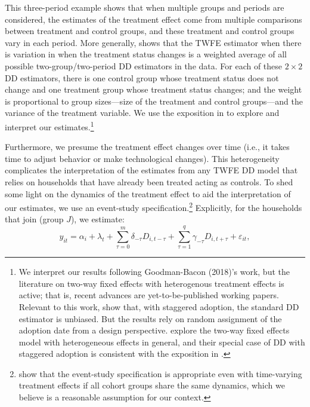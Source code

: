 \documentclass[12pt]{article}
\begin{document}
This three-period example shows that when multiple groups and periods are considered, the estimates of the treatment effect come from multiple comparisons between treatment and control groups, and these treatment and control groups vary in each period. More generally, \citet{goodman-baconDifferenceinDifferencesVariationTreatment2018} shows that the TWFE estimator when there is variation in when the treatment status changes is a weighted average of all possible two-group/two-period DD estimators in the data. For each of these $2 \times 2$ DD estimators, there is one control group whose treatment status does not change and one treatment group whose treatment status changes; and the weight is proportional to group sizes---size of the treatment and control groups---and the variance of the treatment variable. We use the exposition in \citet{goodman-baconDifferenceinDifferencesVariationTreatment2018} to explore and interpret our estimates.\footnote{We interpret our results following Goodman-Bacon (2018)'s work, but the literature on two-way fixed effects with heterogenous treatment effects is active; that is, recent advances are yet-to-be-published working papers. Relevant to this work, \citet{atheyDesignbasedAnalysisDifferenceInDifferences2018} show that, with staggered adoption, the standard DD estimator is unbiased. But the results rely on random assignment of the adoption date from a design perspective. \citet{dechaisemartinTwowayFixedEffects2020} explore the two-way fixed effects model with heterogeneous effects in general, and their special case of DD with staggered adoption is consistent with the exposition in \citet{goodman-baconDifferenceinDifferencesVariationTreatment2018}.}

Furthermore, we presume the treatment effect changes over time (i.e., it takes time to adjust behavior or make technological changes). This heterogeneity complicates the interpretation of the estimates from any TWFE DD model that relies on households that have already been treated acting as controls. To shed some light on the dynamics of the treatment effect to aid the interpretation of our estimates, we use an event-study specification.\footnote{\citet{sunEstimatingDynamicTreatment2020} show that the event-study specification is appropriate even with time-varying treatment effects if all cohort groups share the same dynamics, which we believe is a reasonable assumption for our context. } Explicitly, for the households that join (group $J$), we estimate:
\begin{equation}
	y_{it} = \alpha_{i} + \lambda_{t} + \sum_{\tau = 0}^{m} \delta_{- \tau}    D_{i,t - \tau} + \sum_{ \tau = 1}^{q} \gamma_{-\tau} D_{i,t + \tau} + \varepsilon_{it},
\end{equation}
\end{document}

